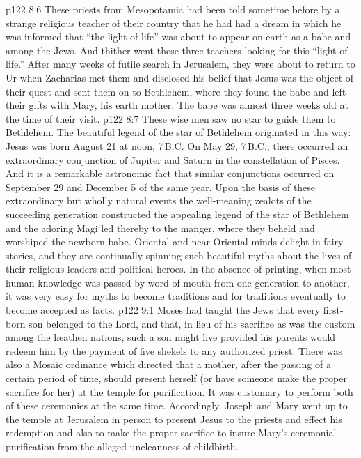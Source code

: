 \vs p122 8:6 These priests from Mesopotamia had been told sometime before by a strange religious teacher of their country that he had had a dream in which he was informed that “the light of life” was about to appear on earth as a babe and among the Jews. And thither went these three teachers looking for this “light of life.” After many weeks of futile search in Jerusalem, they were about to return to Ur when Zacharias met them and disclosed his belief that Jesus was the object of their quest and sent them on to Bethlehem, where they found the babe and left their gifts with Mary, his earth mother. The babe was almost three weeks old at the time of their visit.
\vs p122 8:7 These wise men saw no star to guide them to Bethlehem. The beautiful legend of the star of Bethlehem originated in this way: Jesus was born August 21 at noon, 7\,B.C. On May 29, 7\,B.C., there occurred an extraordinary conjunction of Jupiter and Saturn in the constellation of Pisces. And it is a remarkable astronomic fact that similar conjunctions occurred on September 29 and December 5 of the same year. Upon the basis of these extraordinary but wholly natural events the well\hyp{}meaning zealots of the succeeding generation constructed the appealing legend of the star of Bethlehem and the adoring Magi led thereby to the manger, where they beheld and worshiped the newborn babe. Oriental and near\hyp{}Oriental minds delight in fairy stories, and they are continually spinning such beautiful myths about the lives of their religious leaders and political heroes. In the absence of printing, when most human knowledge was passed by word of mouth from one generation to another, it was very easy for myths to become traditions and for traditions eventually to become accepted as facts.
\vs p122 9:1 Moses had taught the Jews that every first\hyp{}born son belonged to the Lord, and that, in lieu of his sacrifice as was the custom among the heathen nations, such a son might live provided his parents would redeem him by the payment of five shekels to any authorized priest. There was also a Mosaic ordinance which directed that a mother, after the passing of a certain period of time, should present herself (or have someone make the proper sacrifice for her) at the temple for purification. It was customary to perform both of these ceremonies at the same time. Accordingly, Joseph and Mary went up to the temple at Jerusalem in person to present Jesus to the priests and effect his redemption and also to make the proper sacrifice to insure Mary’s ceremonial purification from the alleged uncleanness of childbirth.
